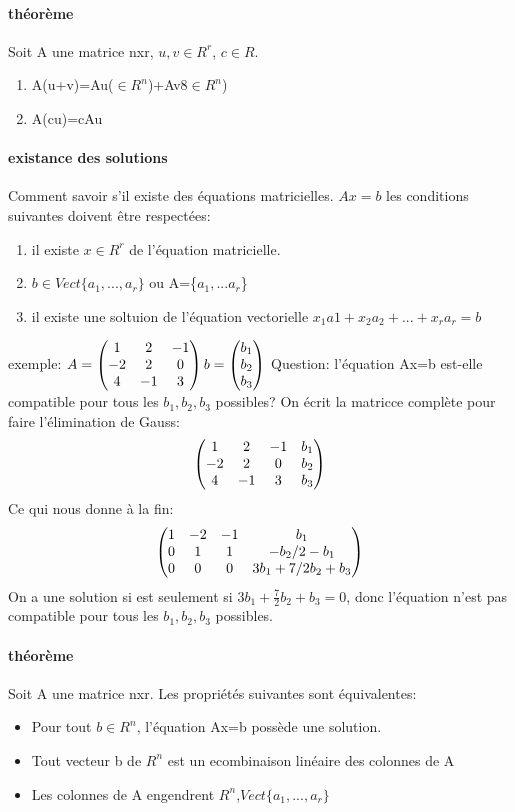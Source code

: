 \documentclass[a4paper,10pt]{article}
\begin{document}
\paragraph{théorème}
Soit A une matrice nxr, $u,v\in R^r$, $c\in R$.
\begin{enumerate}
 \item A(u+v)=Au($\in R^n$)+Av8$\in R^n$)
 \item A(cu)=cAu
\end{enumerate}

\paragraph{existance des solutions}
Comment savoir s'il existe des équations matricielles.
\newline
$Ax=b$
\newline
les conditions suivantes doivent être respectées:
\begin{enumerate}
 \item il existe $ x\in R^r$ de l'équation matricielle.
 \item $b\in Vect\{a_1,...,a_r\}$ ou A=\{$a_1,...a_r$\}
 \item il existe une soltuion de l'équation vectorielle $x_1a1+x_2a_2+...+x_ra_r=b$
\end{enumerate}
exemple:
$A=
\begin{pmatrix}
 1&2&-1\cr
 -2&2&0\cr
 4&-1&3\cr
\end{pmatrix}
b=
\begin{pmatrix}
 b_1\cr
 b_2\cr
 b_3
\end{pmatrix}
$
\newline
Question: l'équation Ax=b est-elle compatible pour tous les $b_1,b_2,b_3$ possibles?
\newline
On écrit la matricce complète pour faire l'élimination de Gauss:
\[
\begin{pmatrix}
  1&2&-1&b_1\cr
 -2&2&0&b_2\cr
 4&-1&3&b_3\cr
\end{pmatrix}
\]
 \newline
 Ce qui nous donne à la fin:
 \[
\begin{pmatrix}
  1&-2&-1&b_1\cr
 0&1&1&-b_2/2-b_1\cr
 0&0&0&3b_1+7/2b_2+b_3\cr
\end{pmatrix}
\]
\newline
On a une solution si est seulement si $3b_1+\frac{7}{2}b_2+b_3=0$, donc l'équation n'est pas compatible pour tous les $b_1,b_2,b_3$ possibles.
\paragraph{théorème}
Soit A une matrice nxr.
\newline
Les propriétés suivantes sont équivalentes:
\begin{itemize}
 \item Pour tout $b\in R^n$, l'équation Ax=b possède une solution.
 \item Tout vecteur b de $R^n$ est un ecombinaison linéaire des colonnes de A
 \item Les colonnes de A engendrent $R^n$,$Vect\{a_1,...,a_r\}$
\end{itemize}
\end{document}
